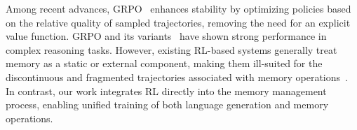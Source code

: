 Among recent advances, GRPO~\citep{shao2024deepseekmath} enhances stability by optimizing policies based on the relative quality of sampled trajectories, removing the need for an explicit value function. 
GRPO and its variants~\citep{gilabert2025terminology, wang2025grpo} have shown strong performance in complex reasoning tasks.
However, existing RL-based systems generally treat memory as a static or external component, making them ill-suited for the discontinuous and fragmented trajectories associated with memory operations~\citep{yan2025memory, zhang2025memory}. 
In contrast, our work integrates RL directly into the memory management process, enabling unified training of both language generation and memory operations.


